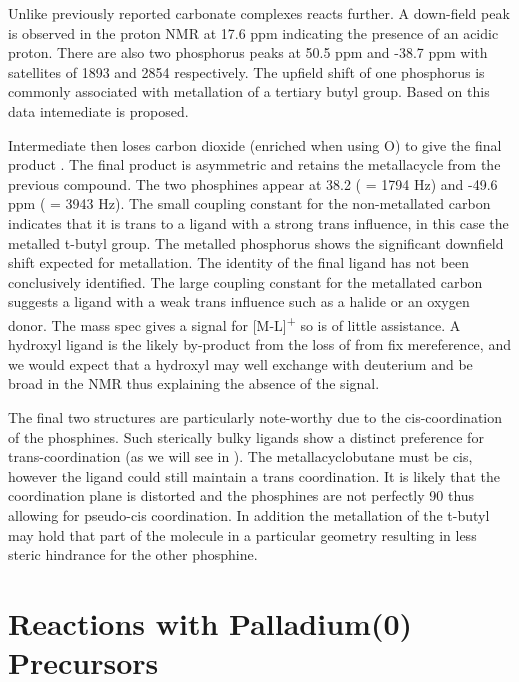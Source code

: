 Unlike previously reported carbonate complexes  reacts further. 
A down-field peak is observed in the proton NMR at 17.6 ppm indicating the presence of an acidic proton.  There are also two phosphorus peaks at 50.5 ppm and -38.7 ppm with satellites of 1893 and 2854 respectively.  The upfield shift of one phosphorus is commonly associated with metallation of a tertiary butyl group.\cite{Garrou1981}  Based on this data intemediate  is proposed. 

Intermediate  then loses carbon dioxide (enriched when using \carbon{}O) to give the final product .  The final product is asymmetric and retains the metallacycle from the  previous compound.  The two phosphines appear at 38.2 (\JPtP{} = 1794 Hz) and -49.6 ppm (\JPtP{} = 3943 Hz).  The small coupling constant for the non-metallated carbon indicates that it is trans to a ligand with a strong trans influence, in this case the metalled t-butyl group.  The metalled phosphorus shows the significant downfield shift expected for metallation.  The identity of the final ligand has not been conclusively identified.  The large coupling constant for the metallated carbon suggests a ligand with a weak trans influence such as a halide or an oxygen donor.  The mass spec gives a signal for [M-L]\textsuperscript{+} so is of little assistance.  A hydroxyl ligand is the likely by-product from the loss of  from fix me{reference}, and we would expect that a hydroxyl may well exchange with deuterium and be broad in the \proton{} NMR thus explaining the absence of the signal.  

The final two structures are particularly note-worthy due to the cis-coordination of the phosphines.  Such sterically bulky ligands show a distinct preference for trans-coordination (as we will see in ).  The metallacyclobutane must be cis, however the ligand could still maintain a trans coordination.  It is likely that the coordination plane is distorted and the phosphines are not perfectly 90 \degrees{} thus allowing for pseudo-cis coordination.  In addition the metallation of the t-butyl may hold that part of the molecule in a particular geometry resulting in less steric hindrance for the other phosphine.  


\section{Reactions with Palladium(0) Precursors}

